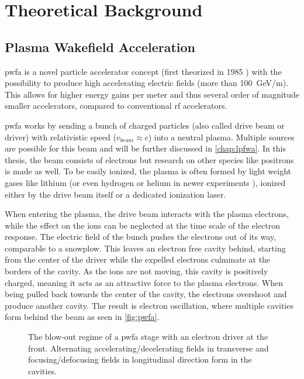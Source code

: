 \documentclass[bachelor_thesis]{subfiles}
\begin{document}
\chapter{Theoretical Background}
\section{Plasma Wakefield Acceleration}
\Gls{pwfa} is a novel particle accelerator concept (first theorized in 1985 \cite{Chen1985}) with the possibility to produce high accelerating electric fields (more than \qty{100}{\GeV/\m}). This allows for higher energy gains per meter
and thus several order of magnitude smaller accelerators, compared to conventional \gls{rf} accelerators.

\Gls{pwfa} works by sending a bunch of charged particles (also called drive beam or driver) with relativistic speed ($v_{beam}\approx c$) into a neutral plasma. Multiple sources are possible for this beam and will be further discussed in \autoref{chap:lpfwa}.
In this thesis, the beam consists of electrons but research on other species like positrons \cite{Gessner2016} is made as well. To be easily ionized, the plasma is often formed by light weight gases like lithium (or even hydrogen or helium in newer experiments \cite{Schoebel2022}), 
ionized either by the drive beam itself or a dedicated ionization laser.

When entering the plasma, the drive beam interacts with the plasma electrons, while the effect on the ions can be neglected at the time scale of the electron response. The electric field of the bunch pushes the electrons out of its way, comparable to a snowplow. 
This leaves an electron free cavity behind, starting from the center of the driver while the expelled electrons culminate at the borders of the cavity. As the ions are not moving, this cavity is positively charged, meaning it acts as an attractive force to the plasma electrons.
When being pulled back towards the center of the cavity, the electrons overshoot and produce another cavity. The result is electron oscillation, where multiple cavities form behind the beam as seen in \autoref{fig:pwfa}.

\begin{figure}
	\centering
	\caption{The blow-out regime of a \gls{pwfa} stage with an electron driver at the front. Alternating accelerating/decelerating fields in transverse and focusing/defocusing fields in longitudinal direction form in the cavities.}
	\label{fig:pwfa}
\end{figure}
\end{document}
